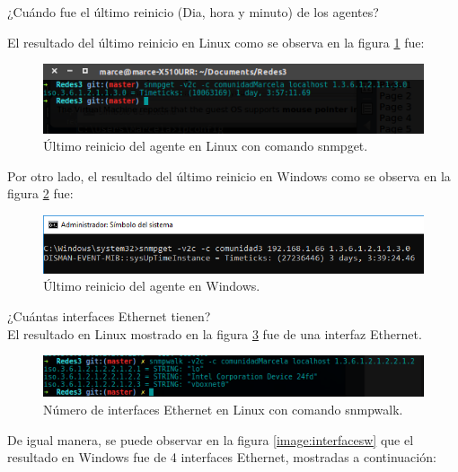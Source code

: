 \item ¿Cuándo fue el último reinicio (Dia, hora y minuto)  de los agentes?

El resultado del último reinicio en Linux como se observa en la figura \ref{image:reinicio} fue:

\FloatBarrier
\begin{figure}[htbp!]
		\centering
	\includegraphics[width=.9 \textwidth]{images/Pregunta1}
		\caption{Último reinicio del agente en Linux con comando snmpget.}
		\label{image:reinicio}
\end{figure}
\FloatBarrier

Por otro lado, el resultado del último reinicio en Windows como se observa en la figura \ref{image:reinicioW} fue:

\FloatBarrier
\begin{figure}[htbp!]
		\centering
			\includegraphics[width=.9 \textwidth]{images/windows1}
		\caption{Último reinicio del agente en Windows.}
		\label{image:reinicioW}
\end{figure}
\FloatBarrier

\item ¿Cuántas interfaces Ethernet tienen?
\\ El resultado en Linux mostrado en la figura \ref{image:interfaces} fue de una interfaz Ethernet.

\FloatBarrier
\begin{figure}[htbp!]
		\centering
	\includegraphics[width=.9 \textwidth]{images/Pregunta2L}
		\caption{Número de interfaces Ethernet en Linux con comando snmpwalk.}		\label{image:interfaces}
\end{figure}
\FloatBarrier

De igual manera, se puede observar en la figura \ref{image:interfacesw} que el resultado en Windows fue de 4 interfaces Ethernet, mostradas a continuación:

